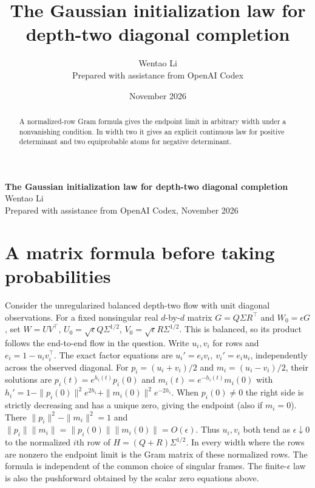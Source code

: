 \documentclass[10pt]{article}
\title{The Gaussian initialization law for depth-two diagonal completion}
\author{Wentao Li\\{\small Prepared with assistance from OpenAI Codex}}
\date{November 2026}
\begin{document}
\begin{center}{\Large\bfseries The Gaussian initialization law for depth-two diagonal completion}\\[3pt]Wentao Li\\{\small Prepared with assistance from OpenAI Codex, November 2026}\end{center}
\begin{abstract}
A normalized-row Gram formula gives the endpoint limit in arbitrary width under a nonvanishing condition. In width two it gives an explicit continuous law for positive determinant and two equiprobable atoms for negative determinant.
\end{abstract}
\section*{A matrix formula before taking probabilities}
Consider the unregularized balanced depth-two flow with unit diagonal observations. For a fixed nonsingular real $d$-by-$d$ matrix $G=Q\Sigma R^\top$ and $W_0=\epsilon G$, set $W=UV^\top$, $U_0=\sqrt{\epsilon}Q\Sigma^{1/2}$, $V_0=\sqrt{\epsilon}R\Sigma^{1/2}$. This is balanced, so its product follows the end-to-end flow in the question. Write $u_i,v_i$ for rows and $e_i=1-u_i v_i^\top$. The exact factor equations are $u_i'=e_i v_i,\ v_i'=e_i u_i$, independently across the observed diagonal. For $p_i=(u_i+v_i)/2$ and $m_i=(u_i-v_i)/2$, their solutions are $p_i(t)=e^{h_i(t)}p_i(0)$ and $m_i(t)=e^{-h_i(t)}m_i(0)$ with $h_i'=1-\|p_i(0)\|^2e^{2h_i}+\|m_i(0)\|^2e^{-2h_i}$. When $p_i(0)\ne0$ the right side is strictly decreasing and has a unique zero, giving the endpoint (also if $m_i=0$). There $\|p_i\|^2-\|m_i\|^2=1$ and $\|p_i\|\|m_i\|=\|p_i(0)\|\|m_i(0)\|=O(\epsilon)$. Thus $u_i,v_i$ both tend as $\epsilon\downarrow0$ to the normalized $i$th row of $H=(Q+R)\Sigma^{1/2}$. In every width where the rows are nonzero the endpoint limit is the Gram matrix of these normalized rows. The formula is independent of the common choice of singular frames. The finite-$\epsilon$ law is also the pushforward obtained by the scalar zero equations above.
\end{document}
